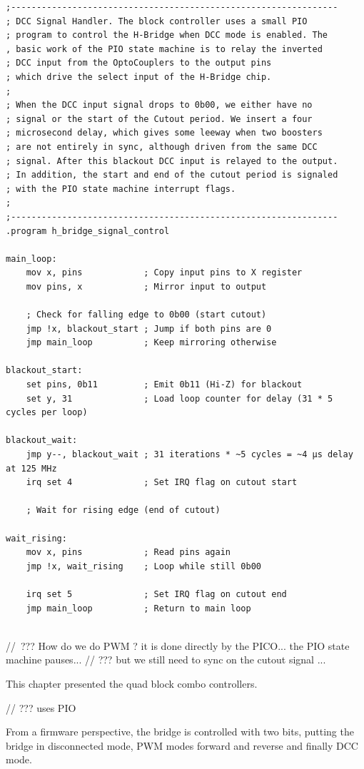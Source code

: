 \pagebreak[3] %
\lstset{style=codesnippetstyle}
\begin{lstlisting}
;----------------------------------------------------------------
; DCC Signal Handler. The block controller uses a small PIO 
; program to control the H-Bridge when DCC mode is enabled. The 
, basic work of the PIO state machine is to relay the inverted 
; DCC input from the OptoCouplers to the output pins
; which drive the select input of the H-Bridge chip. 
; 
; When the DCC input signal drops to 0b00, we either have no 
; signal or the start of the Cutout period. We insert a four 
; microsecond delay, which gives some leeway when two boosters
; are not entirely in sync, although driven from the same DCC 
; signal. After this blackout DCC input is relayed to the output.
; In addition, the start and end of the cutout period is signaled 
; with the PIO state machine interrupt flags.
;
;----------------------------------------------------------------
.program h_bridge_signal_control

main_loop:
    mov x, pins            ; Copy input pins to X register
    mov pins, x            ; Mirror input to output

    ; Check for falling edge to 0b00 (start cutout)
    jmp !x, blackout_start ; Jump if both pins are 0
    jmp main_loop          ; Keep mirroring otherwise

blackout_start:
    set pins, 0b11         ; Emit 0b11 (Hi-Z) for blackout
    set y, 31              ; Load loop counter for delay (31 * 5 cycles per loop)

blackout_wait:
    jmp y--, blackout_wait ; 31 iterations * ~5 cycles = ~4 µs delay at 125 MHz
    irq set 4              ; Set IRQ flag on cutout start

    ; Wait for rising edge (end of cutout)

wait_rising:
    mov x, pins            ; Read pins again
    jmp !x, wait_rising    ; Loop while still 0b00

    irq set 5              ; Set IRQ flag on cutout end
    jmp main_loop          ; Return to main loop
    
\end{lstlisting}

\FloatBarrier


// ??? How do we do PWM ? it is done directly by the PICO... the PIO state machine pauses...
// ??? but we still need to sync on the cutout signal ...



This chapter presented the quad block combo controllers. 

// ??? uses PIO


From a firmware perspective, the bridge is controlled with two bits, putting the bridge in disconnected mode, PWM modes forward and reverse and finally DCC mode.

